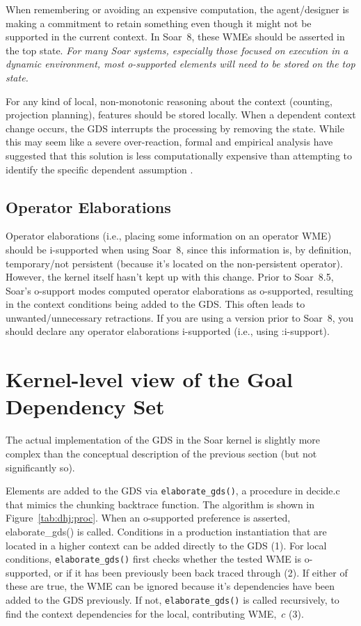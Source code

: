 When remembering or avoiding an expensive computation, the
agent/designer is making a commitment to retain something even though
it might not be supported in the current context.  In Soar~8, these
WMEs should be asserted in the top state.  \emph{For many Soar systems,
especially those focused on execution in a dynamic environment, 
most o-supported elements will need to be stored on the top state.} 

For any kind of local, non-monotonic reasoning about the context
(counting, projection planning), features should be stored locally.
When a dependent context change occurs, the GDS interrupts the
processing by removing the state.  While this may seem like a severe
over-reaction, formal and empirical analysis have suggested that this
solution is less computationally expensive than attempting to identify
the specific dependent assumption \cite{Wray03:Ensuring}.


\subsection*{Operator Elaborations}

Operator elaborations (i.e., placing some information on an operator
WME) should be i-supported when using Soar~8, since this information
is, by definition, temporary/not persistent (because it's located on
the non-persistent operator).  However, the kernel itself hasn't kept
up with this change.  Prior to Soar~8.5, Soar's o-support modes
computed operator elaborations as o-supported, resulting in the
context conditions being added to the GDS.  This often leads to
unwanted/unnecessary retractions.  If you are using a version prior to
Soar~8, you should declare any operator elaborations i-supported (i.e.,
using :i-support).




\section*{Kernel-level view of the Goal Dependency Set}


The actual implementation of the GDS in the Soar kernel is slightly
more complex than the conceptual description of the previous section
(but not significantly so).  

Elements are added to the GDS via \verb+elaborate_gds()+, a procedure in
decide.c that mimics the chunking backtrace function.  The algorithm
is shown in Figure~\ref{tab:dhj:proc}.  When an o-supported preference
is asserted, elaborate\_gds() is called.  Conditions in a production
instantiation that are located in a higher context can be added
directly to the GDS (1).  For local conditions, \verb+elaborate_gds()+ first
checks whether the tested WME is o-supported, or if it has been
previously been back traced through (2). If either of these are true,
the WME can be ignored because it's dependencies have been added to
the GDS previously.  If not, \verb+elaborate_gds()+ is called recursively,
to find the context dependencies for the local, contributing WME,~$c$
(3).

